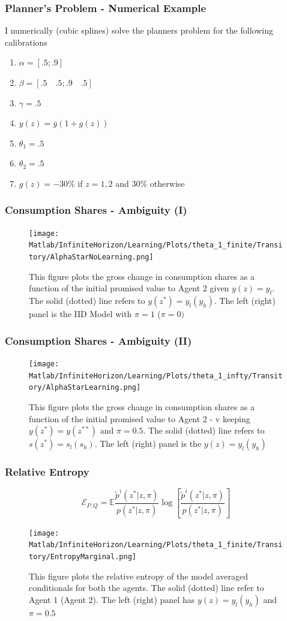 \documentclass{beamer}
\theoremstyle{definition}
\begin{document}
\begin{frame}
\frametitle{Planner's Problem - Numerical Example}
I numerically (cubic splines) solve the planners problem for the following calibrations
\begin{enumerate}
	\item $\alpha =[ .5;.9]$
	\item $\beta=[.5 \quad .5 ;.9 \quad .5]$
	\item $\gamma=.5$
	\item $y(z)=\bar{y}(1+g(z))$
	\item $\theta_1=.5$
\item $\theta_2=.5$
	\item $g(z)=-30\%$ if $z=1,2$ and $30\%$ otherwise
\end{enumerate}

\end{frame}


\begin{frame}
\frametitle{Consumption Shares - Ambiguity (I)}
\begin{figure}[htbp]
\centering
	  \texttt{[image: Matlab/InfiniteHorizon/Learning/Plots/theta\_1\_finite/Transitory/AlphaStarNoLearning.png]}

	\caption{This figure plots the gross change in consumption shares as a function 
of the initial promised value to Agent 2 given $y(z)=y_l$. The solid (dotted) line refers to
 $y(z^*)=y_l (y_h)$. The left (right) panel is the IID Model with $\pi=1$ ($\pi=0)$}
	\label{fig:AlphaStarNoLearning}
\end{figure} 
\end{frame}
\begin{frame}
\frametitle{Consumption Shares - Ambiguity (II)}
\begin{figure}[htbp]
\centering
	  \texttt{[image: Matlab/InfiniteHorizon/Learning/Plots/theta\_1\_infty/Transitory/AlphaStarLearning.png]}

	\caption{ This figure plots the gross change in consumption shares as a function 
of the initial promised value to Agent 2 - v keeping $y(z^*)=y(z^{**})$ and $\pi=0.5$. The solid (dotted) line refers to
 $s(z^*)=s_l (s_h)$. The left (right) panel is the $y(z)=y_l(y_h)$}
	\label{fig:AlphaStarLearning}
\end{figure} 

\end{frame}

\begin{frame}
\frametitle{Relative Entropy}
\small{\[\mathcal{E}_{P,Q} =  \mathbb{E} \frac{\tilde{p}^i(z^*|z,\pi)}{p(z^*|z,\pi)} \log\left[\frac{\tilde{p}^i(z^*|z,\pi)}{p(z^*|z,\pi)}\right]\]}
\begin{figure}[htbp]
\centering
	  \texttt{[image: Matlab/InfiniteHorizon/Learning/Plots/theta\_1\_finite/Transitory/EntropyMarginal.png]}

	\caption{\small{This figure plots the relative entropy of the model averaged
 conditionals for both the agents. The solid (dotted) line refer to Agent 1 (Agent 2). The left (right) panel has $y(z)=y_l (y_h)$ and $\pi=0.5$ }}
 
	\label{fig:EntropyMarginal}
\end{figure} 
\end{frame}
\end{document}
